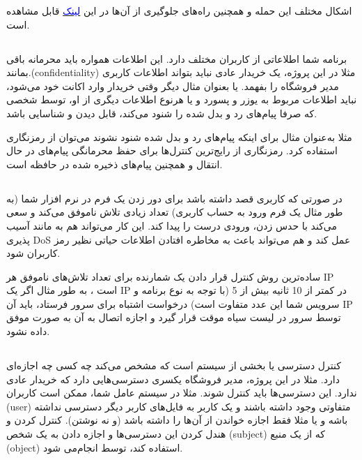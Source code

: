 \documentclass[]{article}
\begin{document}
اشکال مختلف این حمله و همچنین راه‌های جلوگیری از آن‌ها در این \href{https://hdivsecurity.com/owasp-broken-authentication}{\textcolor{blue}{لینک}} قابل مشاهده است.




\subsection*{{}}
برنامه شما اطلاعاتی از کاربران مختلف دارد. این اطلاعات همواره باید محرمانه باقی بمانند.(confidentiality) مثلا در این پروژه، یک خریدار عادی نباید بتواند اطلاعات کاربری مدیر فروشگاه را بفهمد. یا بعنوان مثال دیگر وقتی خریدار وارد اکانت خود می‌شود،‌ نباید اطلاعات مربوط به یوزر و پسورد و یا هرنوع اطلاعات دیگری از او، توسط شخصی که صرفا پیام‌های رد و بدل شده را شنود می‌کند، قابل دیدن و شناسایی باشد. 

مثلا به‌عنوان مثال برای اینکه پیام‌های رد و بدل شده شنود نشوند می‌توان از رمزنگاری استفاده کرد. رمزنگاری از رایج‌ترین کنترل‌ها برای حفظ محرمانگی پیام‌های در حال انتقال و همچنین پیام‌های ذخیره شده در حافظه است.

\subsection*{{}}
در صورتی که کاربری قصد داشته باشد برای دور زدن یک فرم در نرم افزار شما (به طور مثال یک فرم ورود به حساب کاربری) تعداد زیادی تلاش ناموفق می‌کند و سعی می‌کند با حدس زدن، ورودی درست را پیدا کند. این کار می‌تواند هم به مانند آسیب پذیری DoS عمل کند و هم می‌تواند باعث به مخاطره افتادن اطلاعات حیاتی نظیر رمز کاربران شود.

\bigskip

ساده‌ترین روش کنترل قرار دادن یک شمارنده برای تعداد تلاش‌های ناموفق هر IP است ، به طور مثال اگر یک IP در کمتر از 10 ثانیه بیش از 5 (با توجه به نوع برنامه و سرویس شما این عدد متفاوت است) درخواست اشتباه برای سرور فرستاد، باید آن IP توسط سرور در لیست سیاه موقت قرار گیرد و اجازه اتصال به آن به صورت موفق داده نشود.

\subsection*{{}}
کنترل دسترسی یا  بخشی از سیستم است که مشخص می‌کند چه کسی چه اجازه‌ای دارد. مثلا در این پروژه، مدیر فروشگاه یکسری دسترسی‌هایی دارد که خریدار عادی ندارد. این دسترسی‌ها باید کنترل شوند. 
\bigskip
مثلا در سیستم عامل شما، ممکن است کاربران (user)‌ متفاوتی وجود داشته باشند و یک کاربر به فایل‌های کاربر دیگر دسترسی نداشته باشه و یا مثلا فقط اجازه خواندن از آن‌ها را داشته باشد (و نه نوشتن). کنترل کردن و هندل کردن این دسترسی‌ها و اجازه دادن به یک شخص (‌subject‌) که از یک منبع (‌object‌) استفاده کند،‌ توسط  انجام‌می شود. 
\end{document}
